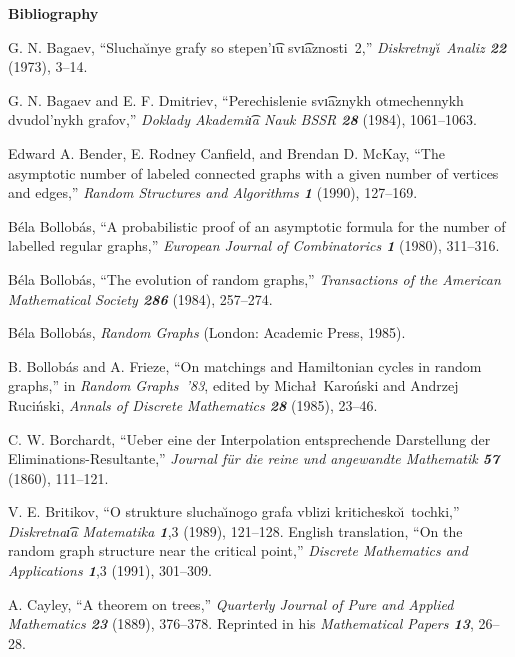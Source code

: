 \vfill\eject

\centerline{\bf Bibliography}

\smallskip
\bib [\Bag]\enspace
G. N. Bagaev, ``Slucha\u\i nye grafy so stepen'\t\i u sv\t\i aznosti~2,''
{\sl Diskretny\u\i\ Analiz\/ \bf 22} (1973), 3--14.

\smallskip
\bib [\BD]\enspace
G. N. Bagaev and E. F. Dmitriev, ``Perechislenie sv\t\i aznykh otmechennykh
dvudol'nykh grafov,'' {\sl Doklady Akademi\t\i a Nauk BSSR\/ \bf28} (1984),
1061--1063.

\smallskip
\bib [\BCM]\enspace
Edward A. Bender, E. Rodney Canfield, and Brendan D. McKay, ``The asymptotic
number of labeled connected graphs with a given number of vertices and
edges,'' {\sl Random Structures and Algorithms\/ \bf1} (1990), 127--169.

\smallskip
\bib [\Bi]\enspace
B\'ela Bollob\'as, ``A probabilistic proof of an asymptotic formula
for the number of labelled regular graphs,'' {\sl European Journal
of Combinatorics\/ \bf 1} (1980), 311--316.

\smallskip
\bib [\Bii]\enspace
B\'ela Bollob\'as, ``The evolution of random graphs,''
{\sl Transactions of the American Mathematical Society\/ \bf 286}
(1984), 257--274.

\smallskip
\bib [\Biii]\enspace
B\'ela Bollob\'as, {\sl Random Graphs\/} (London: Academic Press, 1985).

\smallskip
\bib [\BF]\enspace
B. Bollob\'as and A. Frieze, ``On matchings and Hamiltonian cycles in
random graphs,'' in {\sl Random Graphs~'83}, edited by Micha\l\
Karo\'nski and Andrzej Ruci\'nski, {\sl Annals of Discrete
Mathematics\/ \bf 28} (1985), 23--46.


\smallskip
\bib [\Bor]\enspace
C. W. Borchardt, ``Ueber eine der Interpolation entsprechende Darstellung
der Elim\-inations-Resultante,''
{\sl Journal f\"ur die reine und angewandte Mathematik\/ \bf 57} (1860),
111--121.

\smallskip
\bib [\Bri]\enspace
V. E. Britikov, ``O strukture slucha\u\i nogo grafa vblizi kritichesko\u\i\
tochki,'' {\sl Diskretna\t\i a Matematika\/ \bf1},3 (1989), 121--128.
English translation, ``On the random graph structure near the critical
point,'' {\sl Discrete Mathematics and Applications\/ \bf1},3 (1991),
301--309.

\smallskip
\bib [\Cay]\enspace
A. Cayley, ``A theorem on trees,'' {\sl Quarterly Journal of Pure and
Applied Mathematics\/ \bf 23} (1889), 376--378. Reprinted in his {\sl
Mathematical Papers\/ \bf 13}, 26--28.

